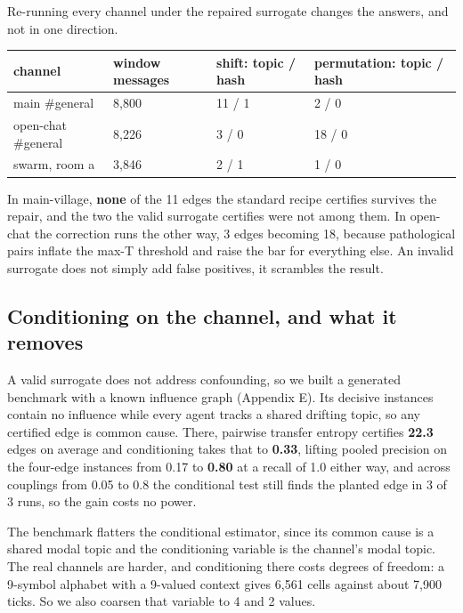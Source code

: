 \documentclass[11pt]{article}
\begin{document}
Re-running every channel under the repaired surrogate changes the answers, and not in one direction.

\begin{center}
\small
\begin{tabular}{llll}
\toprule
\textbf{channel} & \textbf{window messages} & \textbf{shift: topic / hash} & \textbf{permutation: topic / hash} \\
\midrule
main \#general & 8,800 & 11 / 1 & 2 / 0 \\
open-chat \#general & 8,226 & 3 / 0 & 18 / 0 \\
swarm, room a & 3,846 & 2 / 1 & 1 / 0 \\
\bottomrule
\end{tabular}
\end{center}

In main-village, \textbf{none} of the 11 edges the standard recipe certifies survives the repair, and the two the valid surrogate certifies were not among them. In open-chat the correction runs the other way, 3 edges becoming 18, because pathological pairs inflate the max-T threshold and raise the bar for everything else. An invalid surrogate does not simply add false positives, it scrambles the result.

\subsection{Conditioning on the channel, and what it removes}

A valid surrogate does not address confounding, so we built a generated benchmark with a known influence graph (Appendix E). Its decisive instances contain no influence while every agent tracks a shared drifting topic, so any certified edge is common cause. There, pairwise transfer entropy certifies \textbf{22.3} edges on average and conditioning takes that to \textbf{0.33}, lifting pooled precision on the four-edge instances from 0.17 to \textbf{0.80} at a recall of 1.0 either way, and across couplings from 0.05 to 0.8 the conditional test still finds the planted edge in 3 of 3 runs, so the gain costs no power.

The benchmark flatters the conditional estimator, since its common cause is a shared modal topic and the conditioning variable is the channel's modal topic. The real channels are harder, and conditioning there costs degrees of freedom: a 9-symbol alphabet with a 9-valued context gives 6,561 cells against about 7,900 ticks. So we also coarsen that variable to 4 and 2 values.
\end{document}
